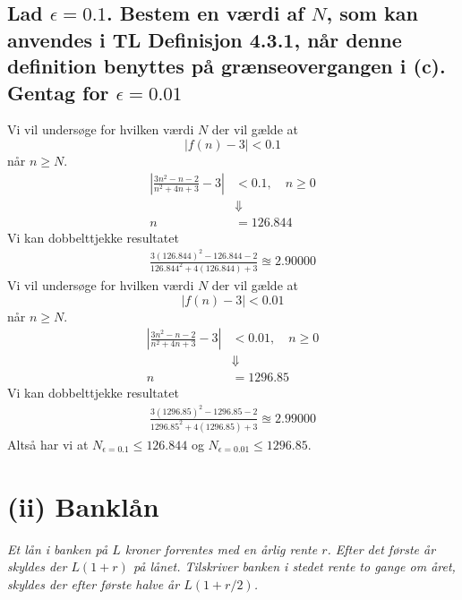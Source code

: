 \documentclass{report}
\begin{document}
\subsection{Lad $\epsilon= 0.1$. Bestem en værdi af $N$, som kan anvendes i TL Definisjon 4.3.1, når denne definition benyttes på grænseovergangen i (c). Gentag for $\epsilon=0.01$}
Vi vil undersøge for hvilken værdi $N$ der vil gælde at $$|f(n)-3|<0.1$$ når $n\geq N$.\begin{align*}
    \left|\frac{3n^2-n-2}{n^2+4n+3}-3\right|&<0.1,\quad n\geq0\\&\Downarrow\\n&=126.844
\end{align*}
Vi kan dobbelttjekke resultatet
\begin{align*}
    \frac{3(126.844)^2-126.844-2}{126.844^2+4(126.844)+3}\approxeq2.90000
\end{align*}
Vi vil undersøge for hvilken værdi $N$ der vil gælde at $$|f(n)-3|<0.01$$ når $n\geq N$.\begin{align*}
    \left|\frac{3n^2-n-2}{n^2+4n+3}-3\right|&<0.01,\quad n\geq0\\&\Downarrow\\n&=1296.85
\end{align*}
Vi kan dobbelttjekke resultatet
\begin{align*}
    \frac{3(1296.85)^2-1296.85-2}{1296.85^2+4(1296.85)+3}\approxeq2.99000
\end{align*}
Altså har vi at $N_{\epsilon=0.1}\leq126.844$ og $N_{\epsilon=0.01}\leq1296.85$.
\section{(ii) Banklån}
\textit{Et lån i banken på $L$ kroner forrentes med en årlig rente $r$. Efter det første år skyldes der $L(1 + r)$ på lånet. Tilskriver banken i stedet rente to gange om året, skyldes der efter første halve år $L(1 + r/2)$.}
\end{document}
